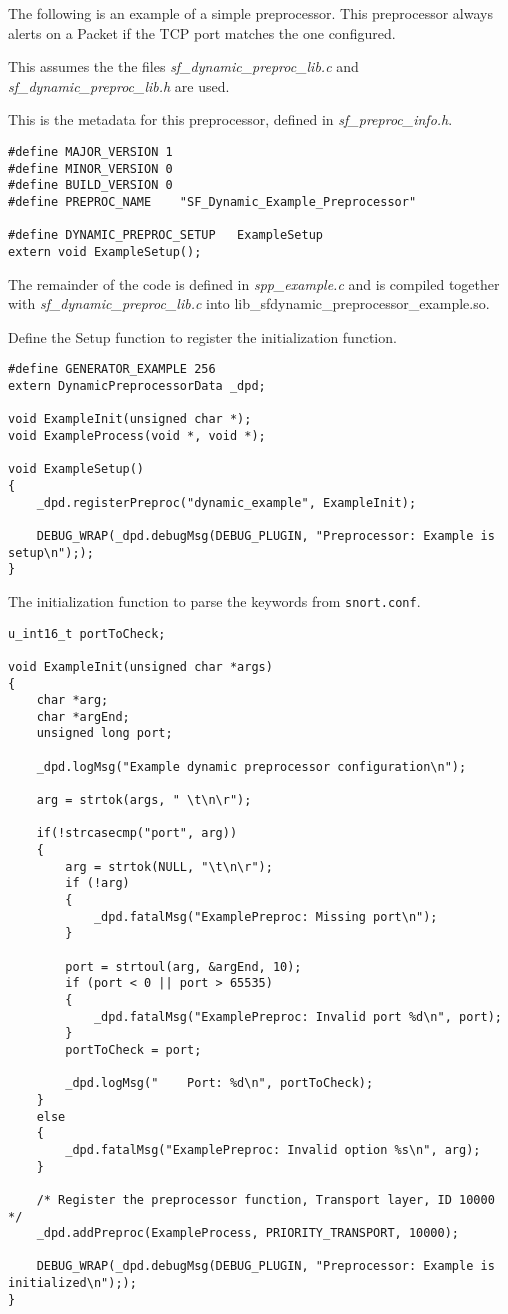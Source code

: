 \documentclass[english]{report}
\begin{document}
The following is an example of a simple preprocessor.  This preprocessor
always alerts on a Packet if the TCP port matches the one configured.

This assumes the the files {\em sf\_dynamic\_preproc\_lib.c} and
{\em sf\_dynamic\_preproc\_lib.h} are used.  

This is the metadata for this preprocessor, defined in
{\em sf\_preproc\_info.h}.

\begin{verbatim}
#define MAJOR_VERSION 1
#define MINOR_VERSION 0
#define BUILD_VERSION 0
#define PREPROC_NAME    "SF_Dynamic_Example_Preprocessor"

#define DYNAMIC_PREPROC_SETUP   ExampleSetup
extern void ExampleSetup();
\end{verbatim}

The remainder of the code is defined in {\em spp\_example.c} and is
compiled together with {\em sf\_dynamic\_preproc\_lib.c} into
lib\_sfdynamic\_preprocessor\_example.so.

Define the Setup function to register the initialization function.

\begin{verbatim}
#define GENERATOR_EXAMPLE 256
extern DynamicPreprocessorData _dpd;

void ExampleInit(unsigned char *);
void ExampleProcess(void *, void *);

void ExampleSetup()
{
    _dpd.registerPreproc("dynamic_example", ExampleInit);

    DEBUG_WRAP(_dpd.debugMsg(DEBUG_PLUGIN, "Preprocessor: Example is setup\n"););
}
\end{verbatim}

The initialization function to parse the keywords from \texttt{snort.conf}.

\begin{verbatim}
u_int16_t portToCheck;

void ExampleInit(unsigned char *args)
{
    char *arg;
    char *argEnd;
    unsigned long port;

    _dpd.logMsg("Example dynamic preprocessor configuration\n");

    arg = strtok(args, " \t\n\r");

    if(!strcasecmp("port", arg))
    {
        arg = strtok(NULL, "\t\n\r");
        if (!arg)
        {
            _dpd.fatalMsg("ExamplePreproc: Missing port\n");
        }
        
        port = strtoul(arg, &argEnd, 10);
        if (port < 0 || port > 65535)
        {
            _dpd.fatalMsg("ExamplePreproc: Invalid port %d\n", port);
        }
        portToCheck = port;
    
        _dpd.logMsg("    Port: %d\n", portToCheck);
    }
    else
    {
        _dpd.fatalMsg("ExamplePreproc: Invalid option %s\n", arg);
    }

    /* Register the preprocessor function, Transport layer, ID 10000 */
    _dpd.addPreproc(ExampleProcess, PRIORITY_TRANSPORT, 10000);

    DEBUG_WRAP(_dpd.debugMsg(DEBUG_PLUGIN, "Preprocessor: Example is initialized\n"););
}
\end{verbatim}
\end{document}
